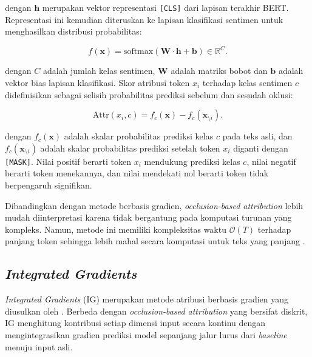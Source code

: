\noindent dengan $\mathbf{h}$ merupakan vektor representasi \texttt{[CLS]} dari
lapisan terakhir BERT. Representasi ini kemudian diteruskan ke lapisan
klasifikasi sentimen untuk menghasilkan distribusi probabilitas:

\begin{equation}
    f(\mathbf{x}) = \text{softmax}(\mathbf{W} \cdot \mathbf{h} + \mathbf{b})
    \in \mathbb{R}^C.
    \label{eq:sentiment_pred}
\end{equation}

\noindent dengan $C$ adalah jumlah kelas sentimen, $\mathbf{W}$ adalah matriks
bobot dan $\mathbf{b}$ adalah vektor bias lapisan klasifikasi. Skor
atribusi token $x_i$ terhadap kelas sentimen $c$ didefinisikan sebagai
selisih probabilitas prediksi sebelum dan sesudah oklusi:

\begin{equation}
    \text{Attr}(x_i, c) = f_c(\mathbf{x}) -
    f_c(\mathbf{x}_{\setminus i}).
    \label{eq:occlusion}
\end{equation}

\noindent dengan $f_c(\mathbf{x})$ adalah skalar probabilitas prediksi kelas $c$
pada teks asli, dan $f_c(\mathbf{x}_{\setminus i})$ adalah skalar
probabilitas prediksi setelah token $x_i$ diganti dengan \texttt{[MASK]}.
Nilai positif berarti token $x_i$ mendukung prediksi kelas $c$, nilai
negatif berarti token menekannya, dan nilai mendekati nol berarti token
tidak berpengaruh signifikan.

Dibandingkan dengan metode berbasis gradien, \textit{occlusion-based
attribution} lebih mudah diinterpretasi karena tidak bergantung pada
komputasi turunan yang kompleks. Namun, metode ini memiliki kompleksitas
waktu $\mathcal{O}(T)$ terhadap panjang token sehingga lebih mahal secara
komputasi untuk teks yang panjang \parencite{li2016visualizing}.

\subsection{\textit{Integrated Gradients}}

\textit{Integrated Gradients} (IG) merupakan metode atribusi berbasis
gradien yang diusulkan oleh \parencite{sundararajan2017axiomatic}. Berbeda
dengan \textit{occlusion-based attribution} yang bersifat diskrit, IG
menghitung kontribusi setiap dimensi input secara kontinu dengan
mengintegrasikan gradien prediksi model sepanjang jalur lurus dari
\textit{baseline} menuju input asli.

